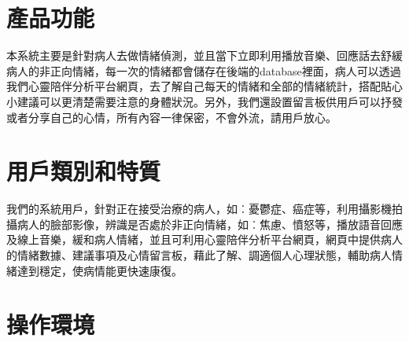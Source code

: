 \documentclass[12pt]{scrreprt}
\begin{document}
\section{產品功能} %
本系統主要是針對病人去做情緒偵測，並且當下立即利用播放音樂、回應話去舒緩病人的非正向情緒，每一次的情緒都會儲存在後端的database裡面，病人可以透過我們心靈陪伴分析平台網頁，去了解自己每天的情緒和全部的情緒統計，搭配貼心小建議可以更清楚需要注意的身體狀況。另外，我們還設置留言板供用戶可以抒發或者分享自己的心情，所有內容一律保密，不會外流，請用戶放心。

\section{用戶類別和特質}
我們的系統用戶，針對正在接受治療的病人，如︰憂鬱症、癌症等，利用攝影機拍攝病人的臉部影像，辨識是否處於非正向情緒，如︰焦慮、憤怒等，播放語音回應及線上音樂，緩和病人情緒，並且可利用心靈陪伴分析平台網頁，網頁中提供病人的情緒數據、建議事項及心情留言板，藉此了解、調適個人心理狀態，輔助病人情緒達到穩定，使病情能更快速康復。

\section{操作環境}
\end{document}
